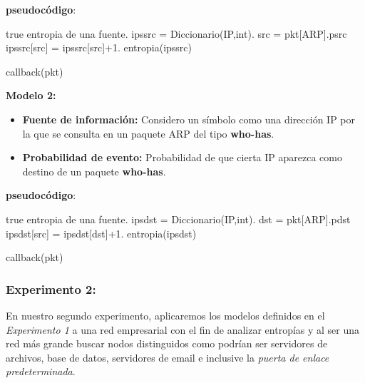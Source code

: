 \newpage
\textbf{pseudocódigo}:
\begin{algorithm}
\begin{algorithmic}
\REQUIRE true
\ENSURE entropia de una fuente.
\STATE ipssrc = Diccionario(IP,int).
\STATE src = pkt[ARP].psrc
\STATE ipssrc[src] = ipssrc[src]+1.
\ENDIF
\RETURN entropia(ipssrc)
\end{algorithmic}
\caption{callback(pkt)}
\end{algorithm}


\textbf{Modelo 2:}
\begin{itemize}
\item \textbf{Fuente de información:} Considero un símbolo como una dirección IP por la que se consulta en un paquete ARP del tipo \textbf{who-has}.
\item \textbf{Probabilidad de evento:} Probabilidad de que cierta IP aparezca como destino de un paquete \textbf{who-has}.
\end{itemize}

\textbf{pseudocódigo}:
\begin{algorithm}
\begin{algorithmic}
\REQUIRE true
\ENSURE entropia de una fuente.
\STATE ipsdst = Diccionario(IP,int).
\STATE dst = pkt[ARP].pdst
\STATE ipsdst[src] = ipsdst[dst]+1.
\ENDIF
\RETURN entropia(ipsdst)
\end{algorithmic}
\caption{callback(pkt)}
\end{algorithm}

\subsubsection{Experimento 2:}
En nuestro segundo experimento, aplicaremos los modelos definidos en el \textit{Experimento 1} a una red empresarial
con el fin de analizar entropías y al ser una red más grande buscar nodos distinguidos como podrían ser servidores de archivos, 
base de datos, servidores de email e inclusive la \textit{puerta de enlace predeterminada}.

